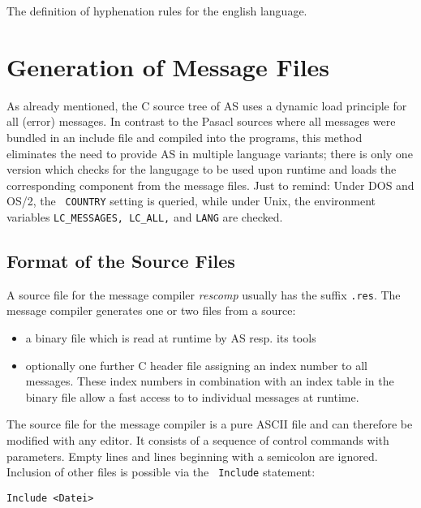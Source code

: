 \documentclass[12pt,twoside]{report}
\newcommand{\asname}{{AS}}
\begin{document}
The definition of hyphenation rules for the english language.


\section{Generation of Message Files}

As already mentioned, the C source tree of \asname{} uses a dynamic load
principle for all (error) messages.  In contrast to the Pasacl sources
where all messages were bundled in an include file and compiled into the
programs, this method eliminates the need to provide \asname{} in multiple
language variants; there is only one version which checks for the
langugage to be used upon runtime and loads the corresponding component
from the message files.  Just to remind: Under DOS and OS/2, the {\tt
COUNTRY} setting is queried, while under Unix, the environment variables
{\tt LC\_MESSAGES, LC\_ALL,} and {\tt LANG} are checked.

\subsection{Format of the Source Files}

A source file for the message compiler {\em rescomp} usually has the
suffix {\tt .res}.  The message compiler generates one or two files from a
source:
\begin{itemize}
\item{a binary file which is read at runtime by \asname{} resp. its tools}
\item{optionally one further C header file assigning an index number to
      all messages. These index numbers in combination with an index
      table in the binary file allow a fast access to to individual
      messages at runtime.}
\end{itemize}

The source file for the message compiler is a pure ASCII file and can
therefore be modified with any editor.  It consists of a sequence of
control commands with parameters.  Empty lines and lines beginning with a
semicolon are ignored.  Inclusion of other files is possible via the {\tt
Include} statement:
\begin{verbatim}
Include <Datei>
\end{verbatim}
\end{document}
